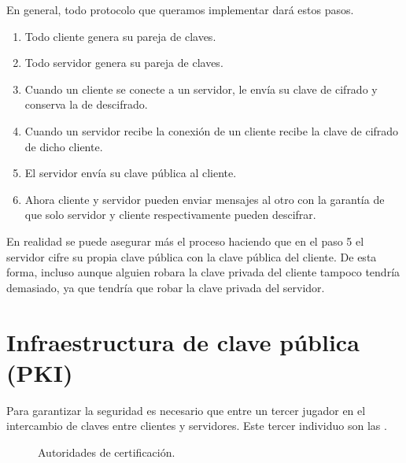 \documentclass[letterpaper,10pt,spanish]{sphinxmanual}
\begin{document}
En general, todo protocolo que queramos implementar dará estos pasos.
\begin{enumerate}
\def\theenumi{\arabic{enumi}}
\def\labelenumi{\theenumi .}
\makeatletter\def\p@enumii{\p@enumi \theenumi .}\makeatother
\item {} 
Todo cliente genera su pareja de claves.

\item {} 
Todo servidor genera su pareja de claves.

\item {} 
Cuando un cliente se conecte a un servidor, le envía su clave de cifrado y conserva la de descifrado.

\item {} 
Cuando un servidor recibe la conexión de un cliente recibe la clave de cifrado de dicho cliente.

\item {} 
El servidor envía su clave pública al cliente.

\item {} 
Ahora cliente y servidor pueden enviar mensajes al otro con la garantía de que solo servidor y cliente respectivamente pueden descifrar.

\end{enumerate}

En realidad se puede asegurar más el proceso haciendo que en el paso 5 el servidor cifre su propia clave pública con la clave pública del cliente. De esta forma, incluso aunque alguien robara la clave privada del cliente tampoco tendría demasiado, ya que tendría que robar la clave privada del servidor.


\section{Infraestructura de clave pública (PKI)}
\label{\detokenize{textos/tema5:infraestructura-de-clave-publica-pki}}
Para garantizar la seguridad es necesario que entre un tercer jugador en el intercambio de claves entre clientes y servidores. Este tercer individuo son las  .

\begin{figure}[htbp]
\centering
\capstart

\noindent{}
\caption{Autoridades de certificación.}\label{\detokenize{textos/tema5:id1}}\end{figure}
\end{document}

